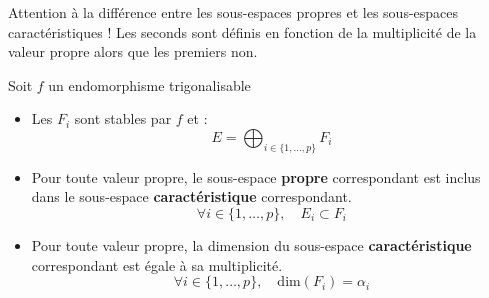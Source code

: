 \begin{remark}
    Attention à la différence entre les sous-espaces propres et les sous-espaces caractéristiques !
    Les seconds sont définis en fonction de la multiplicité de la valeur propre alors que les premiers non. 
\end{remark}

\begin{theorem}
    Soit $f$ un endomorphisme trigonalisable
    \begin{itemize}
        \item Les $F_i$ sont stables par $f$ et :
            \[ E = \bigoplus_{i \in \{1,\dots,p\}} F_i \]
        \item Pour toute valeur propre, le sous-espace \textbf{propre} correspondant est inclus dans le sous-espace 
        \textbf{caractéristique} correspondant. 
            \[ \forall i \in \{1,\dots,p\}, \quad E_i \subset F_i \] 
        \item Pour toute valeur propre, la dimension du sous-espace \textbf{caractéristique} correspondant est égale à sa multiplicité. 
            \[ \forall i \in \{1,\dots,p\}, \quad \text{dim}(F_i) = \alpha_i \]
    \end{itemize}
\end{theorem}


